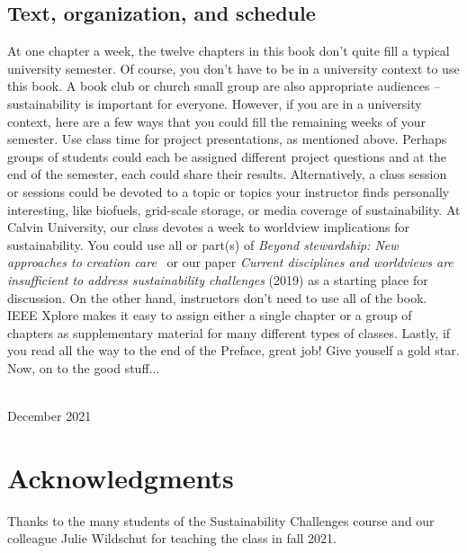 {\section*{Text, organization, and schedule} 
At one chapter a week, the twelve chapters in this book don't quite fill a typical 
university semester. 
Of course, you don't have to be in a university context to use this book. 
A book club or church small group are also appropriate audiences -- sustainability 
is important for everyone. 
However, if you are in a university context, here are a few ways that you could fill the 
remaining weeks of your semester. 
Use class time for project presentations, as mentioned above. 
Perhaps groups of students could each be assigned different project questions and 
at the end of the semester, each could share their results.
Alternatively, a class session or sessions could be devoted to a topic or topics 
your instructor finds personally interesting, like biofuels, grid-scale storage, 
or media coverage of sustainability. 
At Calvin University, our class devotes a week to worldview implications for 
sustainability. 
You could use all or part(s) of \emph{Beyond stewardship: New approaches to 
creation care}~\citep{Warners:2019aa}
or our paper \emph{Current disciplines and worldviews are insufficient
to address sustainability challenges} (2019) as a starting place for discussion. 
On the other hand, instructors don't need to use all of the book. 
IEEE Xplore makes it easy to assign either a single chapter or a group of chapters 
as supplementary material for many different types of classes.
Lastly, if you read all the way to the end of the Preface, great job! 
Give youself a gold star. 
Now, on to the good stuff...


\vspace*{2pc}
\noindent\AUTHORS\\
\noindent December 2021
}

\clearpage




\blankpage

\chapter*{Acknowledgments}
\thispagestyle{plain}

\noindent
Thanks to the many students of the Sustainability Challenges course 
and our colleague Julie Wildschut for teaching the class in fall 2021.

